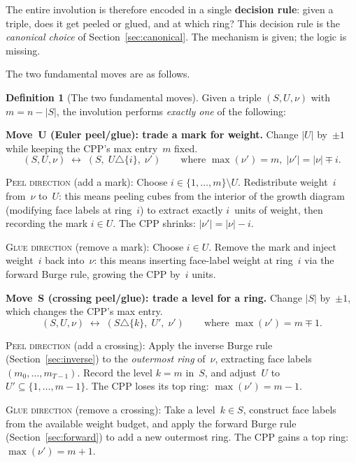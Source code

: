 \documentclass[11pt]{article}
\theoremstyle{plain}
\theoremstyle{definition}
\newtheorem{definition}[theorem]{Definition}
\begin{document}
The entire involution is therefore encoded in a single
\textbf{decision rule}: given a triple, does it get peeled or glued,
and at which ring?  This decision rule is the \emph{canonical
choice} of Section~\ref{sec:canonical}.  The mechanism is given;
the logic is missing.

The two fundamental moves are as follows.

\begin{definition}[The two fundamental moves]
\label{def:two-moves}
Given a triple $(S, U, \nu)$ with $m = n - |S|$, the involution
performs \emph{exactly one} of the following:

\medskip
\noindent\textbf{Move~U (Euler peel/glue): trade a mark for weight.}
Change $|U|$ by~$\pm 1$ while keeping the CPP's max entry~$m$ fixed.
\[
  (S, U, \nu) \;\longleftrightarrow\; (S,\; U \triangle \{i\},\; \nu')
  \qquad\text{where } \max(\nu') = m,\; |\nu'| = |\nu| \mp i.
\]

\noindent
\textsc{Peel direction} (add a mark):
Choose $i \in \{1, \ldots, m\} \setminus U$.  Redistribute
weight~$i$ from~$\nu$ to~$U$:  this means peeling cubes from the
interior of the growth diagram (modifying face labels at ring~$i$)
to extract exactly $i$~units of weight, then recording the mark
$i \in U$.  The CPP shrinks: $|\nu'| = |\nu| - i$.

\smallskip\noindent
\textsc{Glue direction} (remove a mark):
Choose $i \in U$.  Remove the mark and inject weight~$i$ back
into~$\nu$: this means inserting face-label weight at ring~$i$
via the forward Burge rule, growing the CPP by~$i$ units.

\medskip
\noindent\textbf{Move~S (crossing peel/glue): trade a level for
a ring.}
Change $|S|$ by~$\pm 1$, which changes the CPP's max entry.
\[
  (S, U, \nu) \;\longleftrightarrow\;
  (S \triangle \{k\},\; U',\; \nu')
  \qquad\text{where } \max(\nu') = m \mp 1.
\]

\noindent
\textsc{Peel direction} (add a crossing):
Apply the inverse Burge rule (Section~\ref{sec:inverse}) to the
\emph{outermost ring} of~$\nu$, extracting face labels
$(m_0, \ldots, m_{T-1})$.  Record the level $k = m$ in~$S$, and
adjust~$U$ to $U' \subseteq \{1, \ldots, m-1\}$.  The CPP loses
its top ring: $\max(\nu') = m - 1$.

\smallskip\noindent
\textsc{Glue direction} (remove a crossing):
Take a level~$k \in S$, construct face labels from the available
weight budget, and apply the forward Burge rule
(Section~\ref{sec:forward}) to add a new outermost ring.  The CPP
gains a top ring: $\max(\nu') = m + 1$.
\end{definition}
\end{document}
